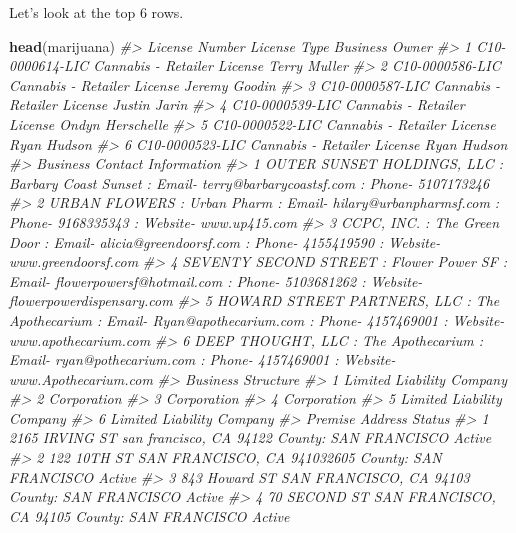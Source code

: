 \documentclass[
  12pt,
]{book}
\newenvironment{Shaded}{\begin{snugshade}}{\end{snugshade}}
\newcommand{\CommentTok}[1]{\textcolor[rgb]{0.37,0.37,0.37}{\textit{#1}}}
\newcommand{\KeywordTok}[1]{\textcolor[rgb]{0.27,0.27,0.27}{\textbf{#1}}}
\newcommand{\NormalTok}[1]{#1}
\begin{document}
Let's look at the top 6 rows.

\begin{Shaded}
\begin{Highlighting}[]
\KeywordTok{head}\NormalTok{(marijuana)}
\CommentTok{\#>    License Number                License Type   Business Owner}
\CommentTok{\#> 1 C10{-}0000614{-}LIC Cannabis {-} Retailer License     Terry Muller}
\CommentTok{\#> 2 C10{-}0000586{-}LIC Cannabis {-} Retailer License    Jeremy Goodin}
\CommentTok{\#> 3 C10{-}0000587{-}LIC Cannabis {-} Retailer License     Justin Jarin}
\CommentTok{\#> 4 C10{-}0000539{-}LIC Cannabis {-} Retailer License Ondyn Herschelle}
\CommentTok{\#> 5 C10{-}0000522{-}LIC Cannabis {-} Retailer License      Ryan Hudson}
\CommentTok{\#> 6 C10{-}0000523{-}LIC Cannabis {-} Retailer License      Ryan Hudson}
\CommentTok{\#>                                                                                                           Business Contact Information}
\CommentTok{\#> 1                             OUTER SUNSET HOLDINGS, LLC  : Barbary Coast Sunset : Email{-} terry@barbarycoastsf.com : Phone{-} 5107173246}
\CommentTok{\#> 2                           URBAN FLOWERS  : Urban Pharm : Email{-} hilary@urbanpharmsf.com : Phone{-} 9168335343 : Website{-} www.up415.com}
\CommentTok{\#> 3                      CCPC, INC.  : The Green Door : Email{-} alicia@greendoorsf.com : Phone{-} 4155419590 : Website{-} www.greendoorsf.com}
\CommentTok{\#> 4 SEVENTY SECOND STREET  : Flower Power SF : Email{-} flowerpowersf@hotmail.com : Phone{-} 5103681262 : Website{-} flowerpowerdispensary.com}
\CommentTok{\#> 5   HOWARD STREET PARTNERS, LLC  : The Apothecarium : Email{-} Ryan@apothecarium.com : Phone{-} 4157469001 : Website{-} www.apothecarium.com}
\CommentTok{\#> 6              DEEP THOUGHT, LLC  : The Apothecarium : Email{-} ryan@pothecarium.com : Phone{-} 4157469001 : Website{-} www.Apothecarium.com}
\CommentTok{\#>          Business Structure}
\CommentTok{\#> 1 Limited Liability Company}
\CommentTok{\#> 2               Corporation}
\CommentTok{\#> 3               Corporation}
\CommentTok{\#> 4               Corporation}
\CommentTok{\#> 5 Limited Liability Company}
\CommentTok{\#> 6 Limited Liability Company}
\CommentTok{\#>                                                 Premise Address Status}
\CommentTok{\#> 1  2165 IRVING ST san francisco, CA 94122 County: SAN FRANCISCO Active}
\CommentTok{\#> 2 122 10TH ST SAN FRANCISCO, CA 941032605 County: SAN FRANCISCO Active}
\CommentTok{\#> 3   843 Howard ST SAN FRANCISCO, CA 94103 County: SAN FRANCISCO Active}
\CommentTok{\#> 4    70 SECOND ST SAN FRANCISCO, CA 94105 County: SAN FRANCISCO Active}

\end{Highlighting}
\end{Shaded}
\end{document}
